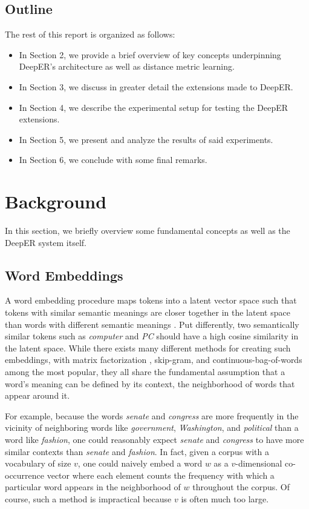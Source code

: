 \documentclass{proc}
\begin{document}
\subsection{Outline}

The rest of this report is organized as follows:
\begin{itemize}
\item{In Section 2, we provide a brief overview of key concepts underpinning DeepER's architecture as well as distance metric learning.} 
\item{In Section 3, we discuss in greater detail the extensions made to DeepER.}
\item{In Section 4, we describe the experimental setup for testing the DeepER extensions.}
\item{In Section 5, we present and analyze the results of said experiments.}
\item{In Section 6, we conclude with some final remarks.} 
\end{itemize}

\section{Background}

In this section, we briefly overview some fundamental concepts as well as the DeepER system itself.

\subsection{Word Embeddings}

A word embedding procedure maps tokens into a latent vector space such that tokens with similar semantic meanings are closer together in the latent space than words with different semantic meanings \cite{mikolov-distributed}. Put differently, two semantically similar tokens such as \textit{computer} and \textit{PC} should have a high cosine similarity in the latent space. While there exists many different methods for creating such embeddings, with matrix factorization \cite{pennington-glove}, skip-gram, and continuous-bag-of-words \cite{mikolov-distributed} among the most popular, they all share the fundamental assumption that a word's meaning can be defined by its context, the neighborhood of words that appear around it.

For example, because the words \textit{senate} and \textit{congress} are more frequently in the vicinity of neighboring words like \textit{government}, \textit{Washington}, and \textit{political} than a word like \textit{fashion}, one could reasonably expect \textit{senate} and \textit{congress} to have more similar contexts than \textit{senate} and \textit{fashion}. In fact, given a corpus with a vocabulary of size $v$, one could naively embed a word $w$ as a $v$-dimensional co-occurrence vector where each element counts the frequency with which a particular word appears in the neighborhood of $w$ throughout the corpus. Of course, such a method is impractical because $v$ is often much too large. 
\end{document}
